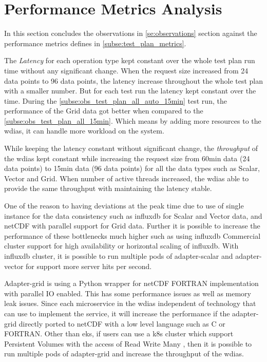 \section{Performance Metrics Analysis}
\label{se:discussion}

In this section concludes the observations in \cref{se:observations} section against the performance metrics defines in \cref{subse:test_plan_metrics}.

The \emph{Latency} for each operation type kept constant over the whole test plan run time without any significant change. When the request size increased from 24 data points to 96 data points, the latency increase throughout the whole test plan with a smaller number. But for each test run the latency kept constant over the time.
During the \cref{subse:obs_test_plan_all_auto_15min} test run, the performance of the Grid data got better when compared to the \cref{subse:obs_test_plan_all_15min}. Which means by adding more resources to the \acrshort{wdias}, it can handle more workload on the system.

While keeping the latency constant without significant change, the \emph{throughput} of the \acrshort{wdias} kept constant while increasing the request size from 60min data (24 data points) to 15min data (96 data points) for all the data types such as Scalar, Vector and Grid.
When number of active threads increased, the \acrshort{wdias} able to provide the same throughput with maintaining the latency stable.

One of the reason to having deviations at the peak time due to use of single instance for the data consistency such as \acrshort{influxdb} for Scalar and Vector data, and netCDF with parallel support for Grid data. Further it is possible to increase the performance of these bottlenecks much higher such as using \acrshort{influxdb} Commercial cluster support for high availability or horizontal scaling of \acrshort{influxdb}. With \acrshort{influxdb} cluster, it is possible to run multiple pods of adapter-scalar and adapter-vector for support more server hits per second.

Adapter-grid is using a Python wrapper for netCDF FORTRAN implementation with parallel IO enabled. This has some performance issues as well as memory leak issues. Since each microservice in the \acrshort{wdias} independent of technology that can use to implement the service, it will increase the performance if the adapter-grid directly ported to netCDF with a low level language such as C or FORTRAN.
Other than \acrshort{eks}, if users can use a \acrshort{k8s} cluster which support Persistent Volumes with the access of Read Write  Many \cite{LinuxFoundationPersistentKubernetes} , then it is possible to run multiple pods of adapter-grid and increase the throughput of the \acrshort{wdias}.

